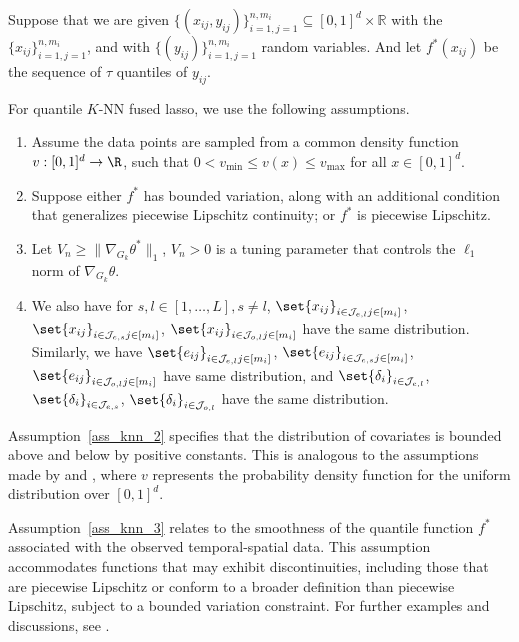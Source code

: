 \documentclass[twoside,11pt]{article}
\begin{document}
Suppose that we are given $\{(x_{ij}, y_{ij})\}_{i=1,j=1}^{n,m_i} \subseteq [0, 1]^d \times \mathbb{R}$ with the $\{x_{ij}\}_{i=1,j=1}^{n,m_i}$, and with $\{( y_{ij})\}_{i=1,j=1}^{n,m_i}$ random variables.  
And let $f^*(x_{ij})$ be the sequence of $\tau$ quantiles of $y_{ij}$.  
\begin{assumption}
\label{ass_knn}
For quantile \( K \)-NN fused lasso, we use the following assumptions.
\begin{enumerate}[label={\bfseries\arabic*.}, ref={\ref{ass_knn}.\arabic*}]
\item\label{ass_knn_2} Assume the data points are sampled from a common density function $v: [0,1]^d \rightarrow \R$, such that \( 0 < v_{\min} \leq  v(x) \leq  v_{\max}\) for all $x \in [0,1]^d$. 
\item\label{ass_knn_3} Suppose either \( f^* \) has bounded variation, along with an additional condition that generalizes piecewise Lipschitz continuity; or \( f^* \) is piecewise Lipschitz. 
\item\label{ass_knn_4} Let $V_n \geq  \|\nabla_{G_k} \theta^*\|_1 $, $V_n > 0$ is a tuning parameter that controls the $\ell_1$ norm of $\nabla_{G_k} \theta $.
\item \label{ass_knn_5} We also have for $s, l \in [1, \dots, L], s\neq l$, 
$\set{x_{ij}}_{i\in \mathcal{J}_{e, l} j \in [m_i]}
$, $\set{x_{ij}}_{i\in \mathcal{J}_{e, s} j \in [m_i]}
$, $\set{x_{ij}}_{i\in \mathcal{J}_{o, l} j \in [m_i]}
$ have the same distribution. 
Similarly, we have  $\set{e_{ij}}_{i\in \mathcal{J}_{e, l} j \in [m_i]}
$, $\set{e_{ij}}_{i\in \mathcal{J}_{e, s} j \in [m_i]}
$, $\set{e_{ij}}_{i\in \mathcal{J}_{o, l} j \in [m_i]}
$ have same distribution, and $\set{\delta_{i}}_{i\in \mathcal{J}_{e, l}}
$, $\set{\delta_{i}}_{i\in \mathcal{J}_{e, s}}
$, $\set{\delta_{i}}_{i\in \mathcal{J}_{o, l}}
$ have the same distribution.
\end{enumerate}
\end{assumption}


Assumption~\ref{ass_knn_2} specifies that the distribution of covariates is bounded above and below by positive constants. This is analogous to the assumptions made by \cite{gyorfi2002distribution} and \cite{meinshausen2006quantile}, where \(v\) represents the probability density function for the uniform distribution over \([0, 1]^d\).

Assumption~\ref{ass_knn_3} relates to the smoothness of the quantile function \(f^*\) associated with the observed temporal-spatial data. This assumption accommodates functions that may exhibit discontinuities, including those that are piecewise Lipschitz or conform to a broader definition than piecewise Lipschitz, subject to a bounded variation constraint. For further examples and discussions, see \cite{madrid2020adaptive}.
\end{document}
